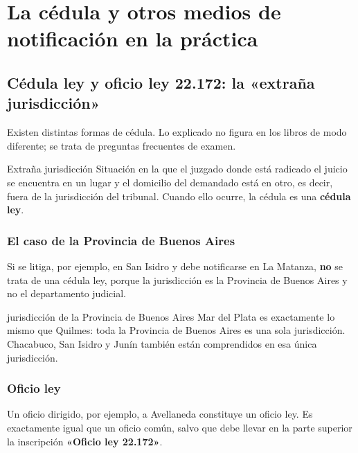 \documentclass[12pt,oneside]{book}
\begin{document}
\chapter[La cédula y otros medios en la práctica]{La cédula y otros medios de notificación en la práctica}

\section{Cédula ley y oficio ley 22.172: la «extraña jurisdicción»}

Existen distintas formas de cédula. Lo explicado no figura en los libros de modo diferente; se trata de preguntas frecuentes de examen.

\begin{definition}{Extraña jurisdicción}
Situación en la que el juzgado donde está radicado el juicio se encuentra en un lugar y el domicilio del demandado está en otro, es decir, fuera de la jurisdicción del tribunal. Cuando ello ocurre, la cédula es una \textbf{cédula ley}.
\end{definition}

\subsection{El caso de la Provincia de Buenos Aires}

Si se litiga, por ejemplo, en San Isidro y debe notificarse en La Matanza, \textbf{no} se trata de una cédula ley, porque la jurisdicción es la Provincia de Buenos Aires y no el departamento judicial.

\begin{example}{jurisdicción de la Provincia de Buenos Aires}
Mar del Plata es exactamente lo mismo que Quilmes: toda la Provincia de Buenos Aires es una sola jurisdicción. Chacabuco, San Isidro y Junín también están comprendidos en esa única jurisdicción.
\end{example}

\subsection{Oficio ley}

Un oficio dirigido, por ejemplo, a Avellaneda constituye un oficio ley. Es exactamente igual que un oficio común, salvo que debe llevar en la parte superior la inscripción \textbf{«Oficio ley 22.172»}.
\end{document}
